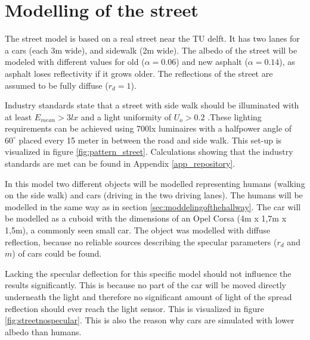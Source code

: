 \section{Modelling of the street}
The street model is based on a real street near the TU delft. It has two lanes for a cars (each 3m wide), and sidewalk (2m wide). The albedo of the street will be modeled with different values for old ($\alpha = 0.06$) and new asphalt ($\alpha = 0.14$), as asphalt loses reflectivity if it grows older\cite{Albedo}. The reflections of the street are assumed to be fully diffuse ($r_d = 1$).

Industry standards state that a street with side walk should be illuminated with at least $E_{mean} > 3lx$ and a light uniformity of $U_o > 0.2$ \cite{HandboekBestaandeBouw}.These lighting requirements can be achieved using 700lx luminaires with a halfpower angle of $60^{\circ}$ placed every 15 meter in between the road and side walk. This set-up is visualized in figure \ref{fig:pattern_street}. Calculations showing that the industry standards are met can be found in Appendix \ref{app_repository}.

In this model two different objects will be modelled representing humans (walking on the side walk) and cars (driving in the two driving lanes). The humans will be modelled in the same way as in section \ref{sec:moddelingofthehallway}. The car will be modelled as a cuboid with the dimensions of an Opel Corsa (4m x 1,7m x 1,5m), a commonly seen small car. The object was modelled with diffuse reflection, because no reliable sources describing the specular parameters ($r_d$ and $m$) of cars could be found.

Lacking the specular deflection for this specific model should not influence the results significantly. This is because no part of the car will be moved directly underneath the light and therefore no significant amount of light of the spread reflection should ever reach the light sensor. This is visualized in figure \ref{fig:streetnospecular}. This is also the reason why cars are simulated with lower albedo than humans.

